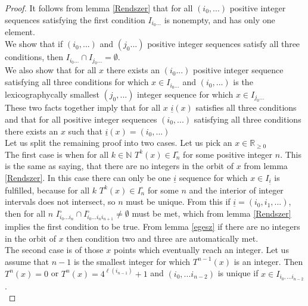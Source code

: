 \documentclass{article}
\begin{document}
\begin{proof}
It follows from lemma \ref{Rendszer} that for all $(i_0,...)$ positive integer sequences satisfying the first condition $I_{i_0...}$ is nonempty, and has only one element.\\

We show that if $(i_0,...)$ and $(j_0...)$ positive integer sequences satisfy all three conditions, then $I_{i_0...} \cap I_{j_0...}= \emptyset$.\\

We also show that for all $x$ there exists an $(i_0...)$ positive integer sequence satisfying all three conditions for which $x\in I_{i_0...}$ and $(i_0,...)$ is the lexicographycally smallest $(j_0,...)$ integer sequence for which $x\in I_{j_0...}$\\

These two facts together imply that for all $x$ $\underline{i}(x)$ satisfies all three conditions and that for all positive integer sequences $(i_0,...)$ satisfying all three conditions there exists an $x$ such that $\underline{i}(x) = (i_0,...)$\\ 

Let us split the remaining proof into two cases. Let us pick an $x \in \mathbb{R}_{\geq 0}$\\

The first case is when for all $k\in \mathbb{N}$ $T^k(x) \in I_n^\circ$ for some positive integer $n$. This is the same as saying, that there are no integers in the orbit of $x$ from lemma \ref{Rendszer}. In this case there can only be one $\underline{i}$ sequence for which $x \in I_{\underline{i}}$ is fulfilled, because for all $k$ $T^k(x)\in I_n^\circ$ for some $n$ and the interior of integer intervals does not intersect, so $n$ must be unique. 
From this if $\underline{i} = (i_0, i_1, ...)$, then for all $n$ $I_{i_0...i_n}^\circ \cap I_{i_0...i_ni_{n+1}}^\circ \neq \emptyset$ must be met, which from lemma \ref{Rendszer} implies the first condition to be true.
From lemma \ref{egesz} if there are no integers in the orbit of $x$ then condition two and three are automatically met.\\

The second case is of those $x$ points which eventually reach an integer. Let us assume that $n-1$ is the smallest integer for which $T^{n-1}(x)$ is an integer. Then $T^n(x)=0$ or $T^n(x) = 4^{\ell(i_{n-1})} +1$ and $(i_0, ... i_{n-2})$ is unique if $x \in I_{i_0, ... i_{n-2}}$.\\


\end{proof}
\end{document}
